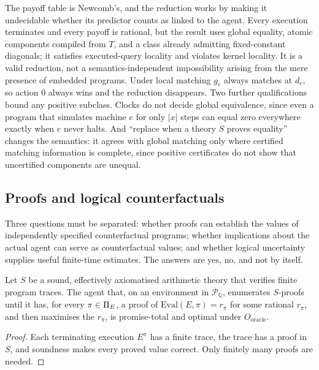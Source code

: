 The payoff table is Newcomb's, and the reduction works by making it undecidable whether its
predictor counts as linked to the agent. Every execution terminates and every payoff is rational,
but the result uses global equality, atomic components compiled from $T$, and a class already
admitting fixed-constant diagonals; it satisfies executed-query locality and violates kernel
locality. It is a valid reduction, not a semantics-independent impossibility arising from the mere
presence of embedded programs. Under local matching $g_e$ always matches at $d_e$, so action $0$ always
wins and the reduction disappears. Two further qualifications bound any positive subclass. Clocks do
not decide global equivalence, since even a program that simulates machine $e$ for only $|x|$ steps
can equal zero everywhere exactly when $e$ never halts. And \enquote{replace when a theory $S$ proves
equality} changes the semantics: it agrees with global matching only where certified matching
information is complete, since positive certificates do not show that uncertified components are
unequal.

\subsection{Proofs and logical counterfactuals}\label{sec:logical}

Three questions must be separated: whether proofs can establish the values of independently
specified counterfactual programs; whether implications about the actual agent can serve as
counterfactual values; and whether logical uncertainty supplies useful finite-time estimates. The
answers are yes, no, and not by itself.

\begin{proposition}\label{prop:proofopt}
Let $S$ be a sound, effectively axiomatised arithmetic theory that verifies finite program traces.
The agent that, on an environment in $\mathcal P_{\mathbb Q}$, enumerates $S$-proofs until it has, for
every $\pi\in\Pi_E$, a proof of $\mathrm{Eval}(E,\pi)=r_\pi$ for some rational $r_\pi$, and then
maximises the $r_\pi$, is promise-total and optimal under $O_{\mathrm{oracle}}$.
\end{proposition}

\begin{proof}
Each terminating execution $E^\pi$ has a finite trace, the trace has a proof in $S$, and soundness
makes every proved value correct. Only finitely many proofs are needed.
\end{proof}

